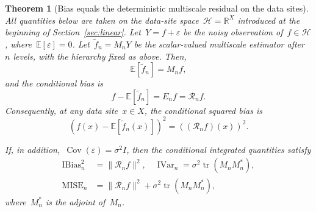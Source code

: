 \documentclass[12pt]{article}
\newtheorem{theorem}{Theorem}[section]
\newcommand{\E}{{\mathbb{E}}}
\newcommand{\R}{\mathbb{R}}
\DeclareMathOperator{\mise}{MISE}
\newcommand{\ibias}{\operatorname{IBias}^2}
\DeclareMathOperator{\ivar}{IVar}
\begin{document}
\begin{theorem}[Bias equals the deterministic multiscale residual on the data sites]\label{thm:bias-equals-residual}
All quantities below are taken on the data-site space~$\mathcal H=\R^{X}$ introduced at the beginning of Section~\ref{sec:linear}. Let~$Y=f+\varepsilon$ be the noisy observation of~$f\in\mathcal H$, where~$\E[\varepsilon]=0$. Let~$\widetilde f_n=M_nY$ be the scalar-valued multiscale estimator after~$n$ levels, with the hierarchy fixed as above. Then,
\begin{equation}\label{eq:expected-multiscale-estimator}
    \E[\widetilde f_n]=M_nf,
\end{equation}
and the conditional bias is
\begin{equation}\label{eq:bias-residual-identity}
    f-\E[\widetilde f_n]=E_nf=\mathcal R_nf.
\end{equation}
Consequently, at any data site~$x \in X$, the conditional squared bias is
\begin{equation}\label{eq:pointwise-bias-residual}
   \left(f(x)-\E[\widetilde f_n(x)]\right)^2=\left((\mathcal R_nf)(x)\right)^2.
\end{equation}

If, in addition,~$\operatorname{Cov}(\varepsilon)=\sigma^2 I$, then the conditional integrated quantities satisfy
\begin{equation}\label{eq:integrated-bias--variance-residual}
\begin{split}  
    \ibias_n &= \|\mathcal R_nf\|^2,
    \quad
    \ivar_n = \sigma^2\operatorname{tr}(M_nM_n^*),
     \\
    \mise_n &= \|\mathcal R_nf\|^2+\sigma^2\operatorname{tr}(M_nM_n^*),
    \end{split}
\end{equation}
where~$M_n^*$ is the adjoint of~$M_n$.
\end{theorem}
\end{document}
